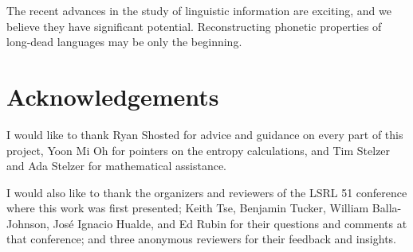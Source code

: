 \documentclass[12pt,twoside]{article}
\begin{document}
The recent advances in the study of linguistic information are exciting, and we believe they have significant potential. Reconstructing phonetic properties of long-dead languages may be only the beginning.

\section*{Acknowledgements}

I would like to thank Ryan Shosted for advice and guidance on every part of this project, Yoon Mi Oh for pointers on the entropy calculations, and Tim Stelzer and Ada Stelzer for mathematical assistance.

I would also like to thank the organizers and reviewers of the LSRL 51 conference where this work was first presented; Keith Tse, Benjamin Tucker, William Balla-Johnson, José Ignacio Hualde, and Ed Rubin for their questions and comments at that conference; and three anonymous reviewers for their feedback and insights.

\label{sec:refs}
\printbibliography
\end{document}
